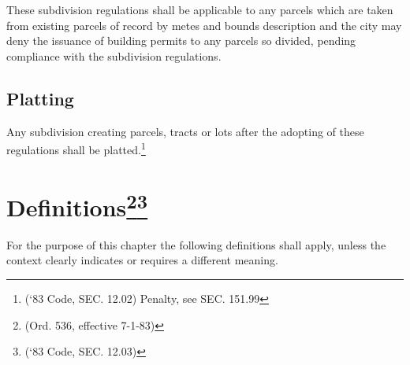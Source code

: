 \subsubsection{}
These subdivision regulations shall be applicable to any parcels which are taken from existing parcels of record by metes and bounds description and the city may deny the issuance of building permits to any parcels so divided, pending compliance with the subdivision regulations.
\subsection{Platting}
Any subdivision creating parcels, tracts or lots after the adopting of these regulations shall be platted.\footnote{(‘83 Code, SEC. 12.02)  Penalty, see SEC. 151.99}
\section{Definitions\footnote{(Ord. 536, effective 7-1-83)}\footnote{(‘83 Code, SEC. 12.03)}}
For the purpose of this chapter the following definitions shall apply, unless the context clearly indicates or requires a different meaning.
